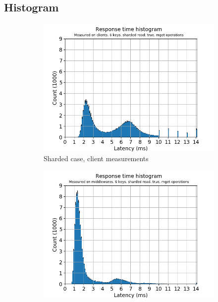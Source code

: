 \documentclass[11pt,a4paper]{article}
\begin{document}
\subsection{Histogram} \label{sec:gmg-hist}
\begin{figure}[h]
\begin{subfigure}{.5\textwidth}
  \centering
  \includegraphics[width=1.0\linewidth ,trim={5px 0px 20px 0px},clip]{img/plot/gmg-hist6-true-mget_clients.png}
  \caption{Sharded case, client measurements}
  \label{fig:gmg-hist6-true-mget_clients}
\end{subfigure}%
\begin{subfigure}{.5\textwidth}
  \centering
  \includegraphics[width=1.0\linewidth ,trim={5px 0px 20px 0px},clip]{img/plot/gmg-hist6-true-mget_middlewares.png}

\end{subfigure}
\end{figure}
\end{document}
